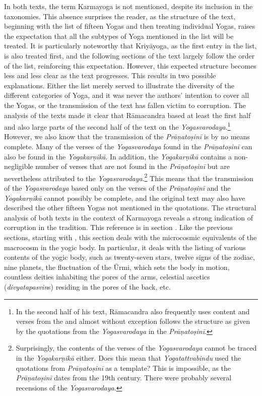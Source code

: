 In both texts, the term Karmayoga is not mentioned, despite its inclusion in the taxonomies. This absence surprises the reader, as the structure of the text, beginning with the list of fifteen Yogas and then treating individual Yogas, raises the expectation that all the subtypes of Yoga mentioned in the list will be treated. It is particularly noteworthy that Kriyāyoga, as the first entry in the list, is also treated first, and the following sections of the text largely follow the order of the list, reinforcing this expectation. However, this expected structure becomes less and less clear as the text progresses. This results in two possible explanations. Either the list merely served to illustrate the diversity of the different categories of Yoga, and it was never the authors' intention to cover all the Yogas, or the transmission of the text has fallen victim to corruption. The analysis of the texts made it clear that Rāmacandra based at least the first half and also large parts of the second half of the text on the \textit{Yogasvarodaya}.\footnote{In the second half of his text, Rāmacandra also frequently uses content and verses from the  and almost without exception follows the structure as given by the quotations from the \textit{Yogasvarodaya} in the \textit{Prāṇatoṣinī}.}
However, we also know that the transmission of the \textit{Prāṇatoṣinī} is by no means complete. Many of the verses of the \textit{Yogasvarodaya} found in the \textit{Prāṇatoṣinī} can also be found in the \textit{Yogakarṇikā}. In addition, the \textit{Yogakarṇikā} contains a non-negligible number of verses that are not found in the \textit{Prāṇatoṣinī} but are nevertheless attributed to the \textit{Yogasvarodaya}.\footnote{Surprisingly, the contents of the verses of the \textit{Yogasvarodaya} cannot be traced in the \textit{Yogakarṇikā} either. Does this mean that \textit{Yogatattvabindu} used the quotations from \textit{Prāṇatoṣinī} as a template? This is impossible, as the \textit{Prāṇatoṣinī} dates from the 19th century. There were probably several recensions of the \textit{Yogasvarodaya}.} This means that the transmission of the \textit{Yogasvarodaya} based only on the verses of the \textit{Prāṇatoṣinī} and the \textit{Yogakarṇikā} cannot possibly be complete, and the original text may also have described the other fifteen Yogas not mentioned in the quotations. The structural analysis of both texts in the context of Karmayoga reveals a strong indication of corruption in the tradition.
This reference is in section . Like the previous sections, starting with , this section deals with the microcosmic equivalents of the macrocosm in the yogic body. In particular, it deals with the listing of various contents of the yogic body, such as twenty-seven stars, twelve signs of the zodiac, nine planets, the fluctuation of the Ūrmi, which sets the body in motion, countless deities inhabiting the pores of the arms, celestial ascetics (\textit{divyatapasvin}s) residing in the pores of the back, etc.
